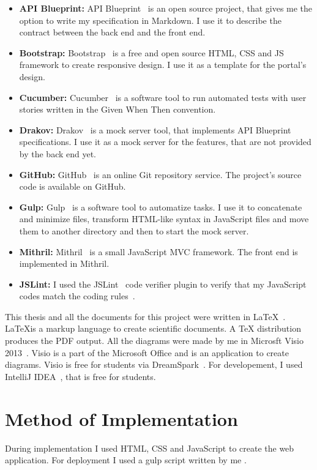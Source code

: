 \begin{itemize}
	\item \textbf{API Blueprint:} API Blueprint~\cite{api-blueprint} is an open source project, that gives me the option to write my specification in Markdown. I use it to describe the contract between the back end and the front end.
	\item \textbf{Bootstrap:} Bootstrap~\cite{Bootstrap} is a free and open source HTML, CSS and JS framework to create responsive design. I use it as a template for the portal's design.
	\item \textbf{Cucumber:} Cucumber~\cite{Cucumber} is a software tool to run automated tests with user stories written in the Given When Then convention. 
	\item \textbf{Drakov:} Drakov~\cite{drakov} is a mock server tool, that implements API Blueprint specifications. I use it as a mock server for the features, that are not provided by the back end yet.
	\item \textbf{GitHub:} GitHub~\cite{github} is an online Git repository service. The project's source code is available on GitHub.
	\item \textbf{Gulp:} Gulp~\cite{gulp} is a software tool to automatize tasks. I use it to concatenate and minimize files, transform HTML-like syntax in JavaScript files and move them to another directory and then to start the mock server.
	\item \textbf{Mithril:} Mithril~\cite{Mithril} is a small JavaScript MVC framework. The front end is implemented in Mithril.
	\item \textbf{JSLint:} I used the JSLint~\cite{jetbrains-jslint} code verifier plugin to verify that my JavaScript codes match the coding rules~\cite{js-conventions}.

\end{itemize}

This thesis and all the documents for this project were written in \LaTeX~\cite{latex}. \LaTeX is a markup language to create scientific documents. A TeX distribution produces the PDF output. All the diagrams were made by me in Microsft Visio 2013~\cite{visio}. Visio is a part of the Microsoft Office and is an application to create diagrams. Visio is free for students via DreamSpark~\cite{msdnaa}. For developement, I used IntelliJ IDEA~\cite{intellij-idea}, that is free for students.


\section{Method of Implementation}
During implementation I used HTML, CSS and JavaScript to create the web application. For deployment I used a gulp script written by me . 

